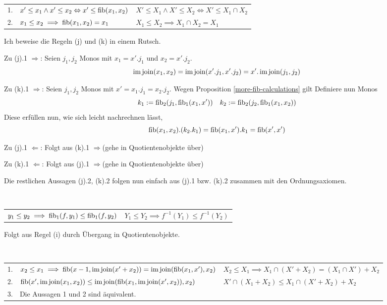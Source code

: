 \begin{lemm}[Regel (k)]
\ \linebreak

\begin{tabular}{rll}
   1.
&  $x' \leq x_1 \wedge x' \leq x_2 \Leftrightarrow x' \leq \operatorname{fib}(x_1,x_2)$
&  $X' \leq X_1 \wedge X' \leq X_2 \Leftrightarrow X' \leq X_1 \cap X_2$
\\ 2.
&  $x_1\leq x_2 \implies \operatorname{fib}(x_1,x_2)  = x_1$
&  $X_1 \leq X_2 \implies X_1 \cap X_2 = X_1$
\end{tabular}
\end{lemm}
\begin{bew}
Ich beweise die Regeln (j) und (k) in einem Rutsch.

Zu (j).1 \glqq$\Rightarrow$\grqq: Seien $j_1,j_2$ Monos mit $x_1 = x'.j_1$ und $x_2 = x'.j_2$.
\[ \operatorname{im}\operatorname{join}(x_1,x_2) = \operatorname{im}\operatorname{join}(x'.j_1,x'.j_2) = x'.\operatorname{im}\operatorname{join}(j_1,j_2) \]

Zu (k).1 \glqq$\Rightarrow$\grqq: Seien $j_1,j_2$ Monos mit $x'=x_1.j_1=x_2.j_2$.
Wegen Proposition \ref{more-fib-calculations} gilt
Definiere nun Monos \[ k_1 := \operatorname{fib}_2(j_1,\operatorname{fib}_1(x_1,x')) \quad
k_2 := \operatorname{fib}_2(j_2,\operatorname{fib}_1(x_1,x_2)) \]
Diese erfüllen nun, wie sich leicht nachrechnen lässt,
\[ \operatorname{fib}(x_1,x_2).(k_2.k_1) = \operatorname{fib}(x_1,x').k_1 = \operatorname{fib}(x',x') \]

Zu (j).1 \glqq$\Leftarrow$\grqq: Folgt aus (k).1  \glqq$\Rightarrow$\grqq (gehe in Quotientenobjekte über)

Zu (k).1 \glqq$\Leftarrow$\grqq: Folgt aus (j).1 \glqq$\Rightarrow$\grqq (gehe in Quotientenobjekte über)

Die restlichen Aussagen (j).2, (k).2 folgen nun einfach aus (j).1 bzw. (k).2 zusammen mit den Ordnungsaxiomen.

\end{bew}



\begin{lemm}[Regel (l)]
\ \linebreak

\begin{tabular}{ll}
   $y_1 \leq y_2 \implies \operatorname{fib}_1(f,y_1) \leq \operatorname{fib}_1(f,y_2)$
&  $Y_1 \leq Y_2 \implies f^{-1}(Y_1) \leq f^{-1}(Y_2)$
\end{tabular}
\end{lemm}
\begin{bew}
Folgt aus Regel (i) durch Übergang in Quotientenobjekte.
\end{bew}

\begin{lemm}[Regel (m)]
\ \linebreak

\begin{tabular}{rll}
   1.
&  $x_2 \leq x_1 \implies \operatorname{fib}(x-1,\operatorname{im}\operatorname{join}(x'+x_2)) = \operatorname{im}\operatorname{join}(\operatorname{fib}(x_1,x'),x_2)$
&  $X_2 \leq X_1 \implies X_1 \cap (X'+X_2) = (X_1\cap X') + X_2$
\\ 2.
&  $\operatorname{fib}(x',\operatorname{im}\operatorname{join}(x_1,x_2)) \leq \operatorname{im}\operatorname{join}(\operatorname{fib}(x_1,\operatorname{im}\operatorname{join}(x',x_2)),x_2)$
&  $X' \cap (X_1 + X_2) \leq X_1 \cap (X' + X_2) + X_2$
\\ 3.
&  Die Aussagen 1 und 2 sind äquivalent.
\end{tabular}
\end{lemm}

